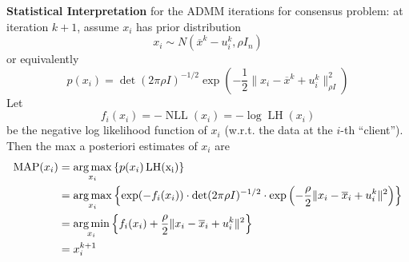{\bfseries Statistical Interpretation} for the ADMM iterations for consensus problem: at iteration $k+1$, assume $x_i$ has prior distribution
$$x_i \sim N(\overline{x}^k-u_i^k, \rho I_n)$$
or equivalently
$$p(x_i) = \det(2\pi\rho I)^{-1/2} \exp\left(-\dfrac{1}{2} \lVert x_i - \overline{x}^k + u_i^k \rVert_{\rho I}^2 \right)$$
Let
$$f_i(x_i) = -\operatorname{NLL}(x_i) = -\log\operatorname{LH}(x_i)$$
be the negative log likelihood function of $x_i$ (w.r.t. the data at the $i$-th ``client''). Then the max a posteriori estimates of $x_i$ are
\begin{align*}
    \operatorname{MAP}(x_i) & = \operatorname*{arg\,max}_{x_i} \left\{ p(x_i) \operatorname{LH(x_i)} \right\} \\
    & = \operatorname*{arg\,max}_{x_i} \left\{ \exp(-f_i(x_i)) \cdot \det(2\pi\rho I)^{-1/2} \cdot \exp\left( -\dfrac{\rho}{2} \lVert x_i - \overline{x}_i + u_i^k \rVert^2 \right) \right\} \\
    & = \operatorname*{arg\,min}_{x_i} \left\{ f_i(x_i) + \dfrac{\rho}{2} \lVert x_i - \overline{x}_i + u_i^k \rVert^2 \right\} \\
    & = x_i^{k+1}
\end{align*}




